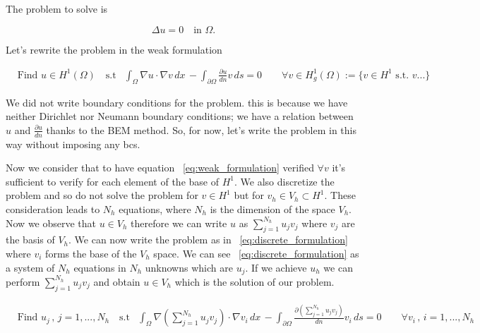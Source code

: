 \documentclass[11pt,onecolumn]{article}
\begin{document}
The problem to solve is 

\begin{equation}
    \Delta u = 0 \quad \text{in } \Omega.
\label{eq:problema_laplaciano}
\end{equation}

Let's rewrite the problem in the weak formulation 

\begin{equation}
\begin{aligned}
&\text{Find } u \in H^1(\Omega) \quad \text{s.t}
&\int_{\Omega} \nabla u \cdot \nabla v \, dx  \, -\int_{\partial\Omega} \frac{\partial u}{dn}v\,ds = 0
\qquad \forall v \in H_{g}^1(\Omega) := \{v \in H^1  \text{ s.t. } v ... \}
\end{aligned}
\label{eq:weak_formulation}
\end{equation}

We did not write boundary conditions for the problem. this is because we have neither Dirichlet nor Neumann boundary conditions; we have a relation between $u$ and $\frac{\partial u}{dn}$ thanks to the BEM method. So, for now, let's write the problem in this way without imposing any bcs.

Now we consider that to have equation ~\eqref{eq:weak_formulation} verified $\forall v$ it's sufficient to verify for each element of the base of $H^1$. We also discretize the problem and so do not solve the problem for $v \in H^1$ but for $v_h \in V_h \subset H^1$. These consideration leads to $N_h$ equations, where $N_h$ is the dimension of the space $V_h$. Now we observe that $u \in V_h$ therefore we can write $u$ as $\sum_{j=1}^{N_h} u_jv_j$ where $v_j$ are the basis of $V_h$. We can now write the problem as in ~\eqref{eq:discrete_formulation} where $v_i$ forms the base of the $V_h$ space. We can see ~\eqref{eq:discrete_formulation} as a system of $N_h$ equations in $N_h$ unknowns which are $u_j$. If we achieve $u_h$ we can perform $\sum_{j=1}^{N_h} u_jv_j$ and obtain $u \in V_h$ which is the solution of our problem.

\begin{equation}
\begin{aligned}
&\text{Find } u_j \,,\, j = 1,...,N_h\quad \text{s.t}
&\int_{\Omega} \nabla (\sum_{j=1}^{N_h} u_jv_j) \cdot \nabla v_i \, dx  \, -\int_{\partial\Omega} \frac{\partial (\sum_{j=1}^{N_h} u_jv_j)}{dn}v_i\,ds = 0
\qquad \forall v_i \,,\, i = 1,...,N_h
\end{aligned}
\label{eq:discrete_formulation}
\end{equation}
\end{document}
